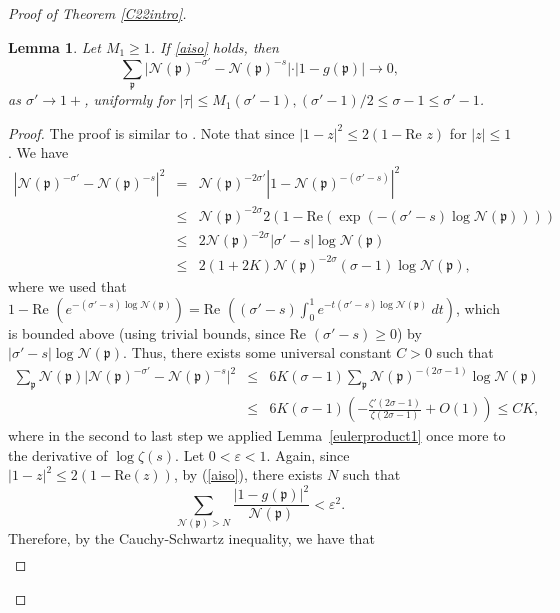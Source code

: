 \documentclass[11pt]{amsart}
\newtheorem{lemma}{Lemma}[section]
\theoremstyle{definition}
\newcommand{\NN}{{\mathcal N}}
\newcommand{\mf}{\mathfrak}
\begin{document}
\begin{proof}[Proof of Theorem \ref{C22intro}]
  \begin{lemma}\label{lem68elliott}
   Let $M_{1}\geq 1$. If \eqref{aiso} holds,
   then
   $$\sum_{\mf p}\vert\NN(\mf p)^{-\sigma'}-\NN(\mf p)^{-s}\vert\cdot\vert 1-g(\mf p)\vert\to 0,$$
   as $\sigma'\to 1+$, uniformly for $\vert\tau\vert\leq M_{1}(\sigma'-1), (\sigma'-1)/2\leq \sigma-1\leq \sigma'-1$. 
   \end{lemma}
   \begin{proof}
The proof is similar to \cite[Lemma~6.8]{E79book}.
       Note that since $|1-z|^2 \leq 2(1-\text{Re } z)$ for $\vert z\vert\leq 1$. We have
       \begin{eqnarray*}
           \left| \NN(\mf p)^{-\sigma'}-\NN(\mf p)^{-s}\right|^{2}
               & = & \NN(\mf p)^{-2\sigma'}\left| 1-\NN(\mf p)^{-(\sigma'-s)}\right|^{2}
               \\&\leq & \NN(\mf p)^{-2\sigma} 2(1-\text{Re}(\exp(-(\sigma'-s)\log\NN(\mf p))))
               \\&\leq & 2\NN(\mf p)^{-2\sigma}\vert\sigma'-s\vert \log \NN(\mf p)\\
              & \leq & 2(1+2K)\NN(\mf p)^{-2\sigma}(\sigma-1)\log \NN(\mf p),
       \end{eqnarray*} 
       where we used that $1-\text{Re }(e^{-(\sigma'-s)\log \NN(\mf p)}) = \text{Re } \left((\sigma'-s)\int_0^1 e^{-t(\sigma'-s)\log \NN(\mf p)} \ dt\right)$, which is bounded above (using trivial bounds, since $\text{Re }(\sigma'-s)\geq 0$) by $|\sigma'-s|\log \NN(\mf p)$. Thus, there exists some universal constant $C>0$ such that
 \begin{eqnarray*}
     \sum_{\mf p}\NN(\mf p)\vert \NN(\mf p)^{-\sigma'}-\NN(\mf p)^{-s}\vert^{2}
               & \leq & 6K(\sigma-1)\sum_{\mf p}\NN(\mf p)^{-(2\sigma-1)}\log \NN(\mf p)
               \\&\leq & 6K(\sigma-1)\left(-\frac{\zeta'(2\sigma-1)}{\zeta(2\sigma-1)}+O(1)\right)\leq CK,
 \end{eqnarray*} 
where in the second to last step we applied Lemma~\ref{eulerproduct1} once more to the derivative of $\log \zeta(s)$. Let $0<\varepsilon<1$. Again, since $\vert 1-z\vert^{2}\leq 2(1-\text{Re}(z))$, by (\ref{aiso}), there exists $N$  such that 
$$\sum_{\NN(\mf p)>N}\frac{\vert 1-g(\mf p)\vert^{2}}{\NN(\mf p)}<\varepsilon^{2}.$$
Therefore, by the Cauchy-Schwartz inequality, we have that 
 \begin{equation}\nonumber
           \begin{split}

\end{split}
\end{equation}
\end{proof}
\end{proof}
\end{document}

